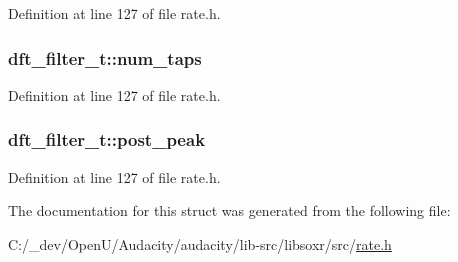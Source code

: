 Definition at line 127 of file rate.\+h.

\subsubsection[{\texorpdfstring{num\+\_\+taps}{num_taps}}]{ dft\+\_\+filter\+\_\+t\+::num\+\_\+taps}\hypertarget{structdft__filter__t_ab38917fa1c8a49d1cc0cbfc94b54ad3d}{}\label{structdft__filter__t_ab38917fa1c8a49d1cc0cbfc94b54ad3d}


Definition at line 127 of file rate.\+h.

\subsubsection[{\texorpdfstring{post\+\_\+peak}{post_peak}}]{ dft\+\_\+filter\+\_\+t\+::post\+\_\+peak}\hypertarget{structdft__filter__t_a7f23e4d4dafd9914a9c891809a88af9a}{}\label{structdft__filter__t_a7f23e4d4dafd9914a9c891809a88af9a}


Definition at line 127 of file rate.\+h.



The documentation for this struct was generated from the following file\+:\begin{DoxyCompactItemize}
\item 
C\+:/\+\_\+dev/\+Open\+U/\+Audacity/audacity/lib-\/src/libsoxr/src/\hyperlink{rate_8h}{rate.\+h}\end{DoxyCompactItemize}
